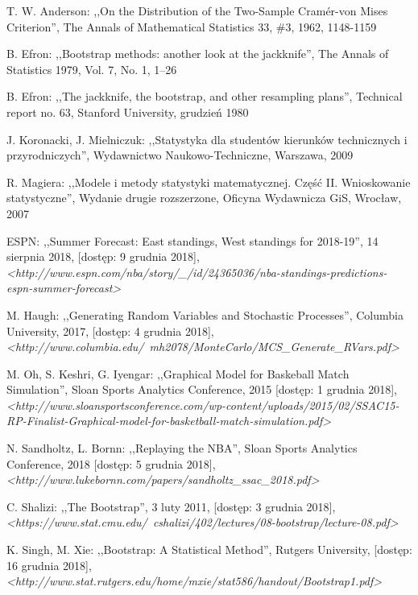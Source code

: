 \documentclass[inzynierska]{pwr_wmat_praca_dyplomowa}
\theoremstyle{plain}
\numberwithin{theorem}{chapter}
\theoremstyle{definition}
\numberwithin{theorem}{chapter}
\begin{document}
\begin{thebibliography}{9}	
	T. W. Anderson: ,,On the Distribution of the Two-Sample Cram\'er-von Mises Criterion'', The Annals of Mathematical Statistics 33, \#3, 1962, 1148-1159
	
	B. Efron: ,,Bootstrap methods: another look at the jackknife'', The Annals of Statistics 1979, Vol. 7, No. 1, 1--26 
	
	B. Efron: ,,The jackknife, the bootstrap, and other resampling plans'', Technical report no. 63, Stanford University, grudzień 1980
	
	J. Koronacki, J. Mielniczuk: ,,Statystyka dla studentów kierunków technicznych i przyrodniczych'', Wydawnictwo Naukowo-Techniczne, Warszawa, 2009
	
	R. Magiera: ,,Modele i metody statystyki matematycznej. Część II. Wnioskowanie statystyczne'', Wydanie drugie rozszerzone, Oficyna Wydawnicza GiS, Wrocław, 2007
	
	ESPN: ,,Summer Forecast: East standings, West standings for 2018-19'', 14 sierpnia 2018, [dostęp: 9 grudnia 2018], \textit{<http://www.espn.com/nba/story/\_/id/24365036/nba-standings-predictions-espn-summer-forecast>}
	
	M. Haugh: ,,Generating Random Variables and Stochastic Processes'', Columbia University, 2017, [dostęp: 4 grudnia 2018], \textit{<http://www.columbia.edu/~mh2078/MonteCarlo/MCS\_Generate\_RVars.pdf>}
	
	M. Oh, S. Keshri, G. Iyengar: ,,Graphical Model for Baskeball Match Simulation'', Sloan Sports Analytics Conference, 2015 [dostęp: 1 grudnia 2018], \textit{<http://www.sloansportsconference.com/wp-content/uploads/2015/02/SSAC15-RP-Finalist-Graphical-model-for-basketball-match-simulation.pdf>}
	
	N. Sandholtz, L. Bornn: ,,Replaying the NBA'', Sloan Sports Analytics Conference, 2018 [dostęp: 5 grudnia 2018], \textit{<http://www.lukebornn.com/papers/sandholtz\_ssac\_2018.pdf>}
		
	C. Shalizi: ,,The Bootstrap'', 3 luty 2011, [dostęp: 3 grudnia 2018], \textit{<https://www.stat.cmu.edu/~cshalizi/402/lectures/08-bootstrap/lecture-08.pdf>}
	
	K. Singh, M. Xie: ,,Bootstrap: A Statistical Method'', Rutgers University, [dostęp: 16 grudnia 2018], \textit{<http://www.stat.rutgers.edu/home/mxie/stat586/handout/Bootstrap1.pdf>}
		

\end{thebibliography}
\end{document}
